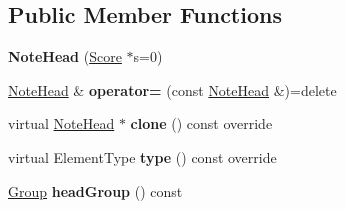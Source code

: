 \subsection*{Public Member Functions}
\begin{DoxyCompactItemize}
\item 
\mbox{\label{class_ms_1_1_note_head_abbc62265b4b61df86888e4632b37c8da}} 
{\bfseries Note\+Head} (\hyperlink{class_ms_1_1_score}{Score} $\ast$s=0)
\item 
\mbox{\label{class_ms_1_1_note_head_a0219753084340809dcfdcc13ab0b3939}} 
\hyperlink{class_ms_1_1_note_head}{Note\+Head} \& {\bfseries operator=} (const \hyperlink{class_ms_1_1_note_head}{Note\+Head} \&)=delete
\item 
\mbox{\label{class_ms_1_1_note_head_a03d4d8cb1875a592f7af3a0c97283132}} 
virtual \hyperlink{class_ms_1_1_note_head}{Note\+Head} $\ast$ {\bfseries clone} () const override
\item 
\mbox{\label{class_ms_1_1_note_head_ad70d54f7c92521331b1ee9450375516a}} 
virtual Element\+Type {\bfseries type} () const override
\item 
\mbox{\label{class_ms_1_1_note_head_a6bd1b8867782c58ef35ded56ddfcb489}} 
\hyperlink{class_group}{Group} {\bfseries head\+Group} () const
\end{DoxyCompactItemize}
